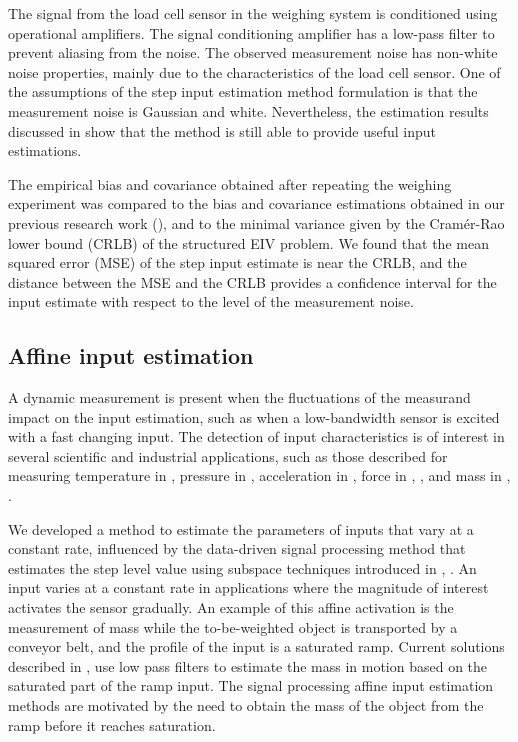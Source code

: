 The signal from the load cell sensor in the weighing system is conditioned using operational amplifiers.
The signal conditioning amplifier has a low-pass filter to prevent aliasing from the noise.
The observed measurement noise has non-white noise properties, mainly due to the characteristics of the load cell sensor.
One of the assumptions of the step input estimation method formulation is that the measurement noise is Gaussian and white. 
Nevertheless, the estimation results discussed in \citet{QuintanaTIM} show that the method is still able to provide useful input estimations.

The empirical bias and covariance obtained after repeating the weighing experiment was compared to the bias and covariance estimations obtained in our previous research work (\citet{QuintanaCSDA}), and to the minimal variance given by the  Cram\'er-Rao lower bound (CRLB) of the structured EIV problem.
We found that the mean squared error (MSE) of the step input estimate is near the CRLB, and the distance between the MSE and the CRLB provides a confidence interval for the input estimate with respect to the level of the measurement noise. 

 
\subsection{Affine input estimation}

A dynamic measurement is present when the fluctuations of the measurand impact on the input estimation, such as when a low-bandwidth sensor is excited with a fast changing input.
The detection of input characteristics is of interest in several scientific and industrial applications, such as those described for measuring temperature in \citet{Saggin01}, pressure in \citet{Matthews14}, acceleration in \citet{Link07}, force in \citet{Vlajic16}, \citet{Hessling08a}, and mass in \citet{Shu93}, \citet{Boschetti13}.

We developed a method to estimate the parameters of inputs that vary at a constant rate, influenced by the data-driven signal processing method that estimates the step level value using subspace techniques introduced in \citet{Markovsky15cep}, \citet{Markovsky15ieee}.
An input varies at a constant rate in applications where the magnitude of interest activates the sensor gradually. 
An example of this affine activation is the measurement of mass while the to-be-weighted object is transported by a conveyor belt, and the profile of the input is a saturated ramp.
Current solutions described in \citet{Tasaki07}, \citet{Pietrzak14} use low pass filters to estimate the mass in motion based on the saturated part of the ramp input.
The signal processing affine input estimation methods are motivated by the need to obtain the mass of the object from the ramp before it reaches saturation.

